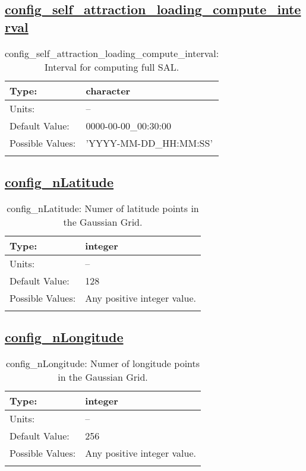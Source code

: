 \subsection[config\_self\_attraction\_loading\_compute\_interval]{\hyperref[sec:nm_tab_self_attraction_loading]{config\_self\_attraction\_loading\_compute\_interval}}
\label{subsec:nm_sec_config_self_attraction_loading_compute_interval}
\begin{center}
\begin{longtable}{| p{2.0in} || p{4.0in} |}
    \hline
    Type: & character \\
    \hline
    Units: & -- \\
    \hline
    Default Value: & 0000-00-00\_00:30:00 \\
    \hline
    Possible Values: & 'YYYY-MM-DD\_HH:MM:SS' \\
    \hline
    \caption{config\_self\_attraction\_loading\_compute\_interval: Interval for computing full SAL.}
\end{longtable}
\end{center}
\subsection[config\_nLatitude]{\hyperref[sec:nm_tab_self_attraction_loading]{config\_nLatitude}}
\label{subsec:nm_sec_config_nLatitude}
\begin{center}
\begin{longtable}{| p{2.0in} || p{4.0in} |}
    \hline
    Type: & integer \\
    \hline
    Units: & -- \\
    \hline
    Default Value: & 128 \\
    \hline
    Possible Values: & Any positive integer value. \\
    \hline
    \caption{config\_nLatitude: Numer of latitude points in the Gaussian Grid.}
\end{longtable}
\end{center}
\subsection[config\_nLongitude]{\hyperref[sec:nm_tab_self_attraction_loading]{config\_nLongitude}}
\label{subsec:nm_sec_config_nLongitude}
\begin{center}
\begin{longtable}{| p{2.0in} || p{4.0in} |}
    \hline
    Type: & integer \\
    \hline
    Units: & -- \\
    \hline
    Default Value: & 256 \\
    \hline
    Possible Values: & Any positive integer value. \\
    \hline
    \caption{config\_nLongitude: Numer of longitude points in the Gaussian Grid.}
\end{longtable}
\end{center}

